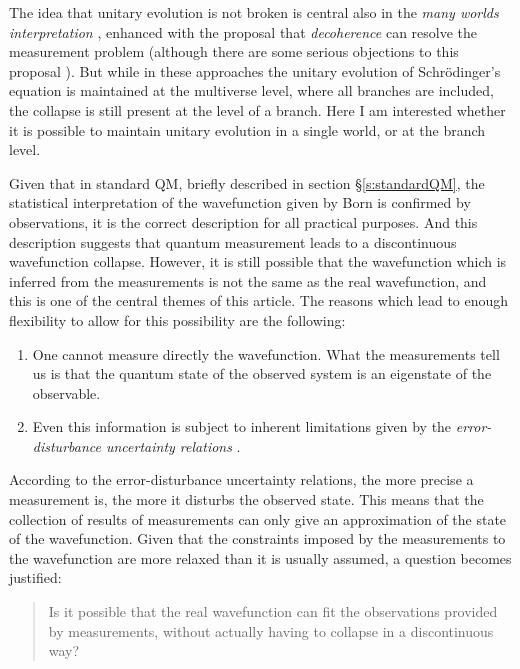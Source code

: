 \documentclass[12pt]{amsart}
\theoremstyle{definition}
\theoremstyle{plain}
\begin{document}
The idea that unitary evolution is not broken is central also in the \emph{many worlds interpretation} \cite{Eve57,Eve73,dWEG73,Vaidman2002MWI}, enhanced with the proposal that \emph{decoherence} can resolve the measurement problem \cite{Zeh96,Zurek2003Decoherence,schlosshauer2005decoherence} (although there are some serious objections to this proposal \cite{pessoa1997canDecoherence,leggett2002limitsQM,kastner2014einselection}). But while in these approaches the unitary evolution of Schr\"odinger's equation is maintained at the multiverse level, where all branches are included, the collapse is still present at the level of a branch. Here I am interested whether it is possible to maintain unitary evolution in a single world, or at the branch level.

Given that in standard QM, briefly described in section \S\ref{s:standardQM}, the statistical interpretation of the wavefunction given by Born is confirmed by observations, it is the correct description for all practical purposes. And this description suggests that quantum measurement leads to a discontinuous wavefunction collapse. However, it is still possible that the wavefunction which is inferred from the measurements is not the same as the real wavefunction, and this is one of the central themes of this article.
The reasons which lead to enough flexibility to allow for this possibility are the following:
\begin{enumerate}
	\item 
One cannot measure directly the wavefunction. What the measurements tell us is that the quantum state of the observed system is an eigenstate of the observable.
	\item 
Even this information is subject to inherent limitations given by the \emph{error-disturbance uncertainty relations} \cite{Heisenberg1927Uncertainty,Ozawa2003Heisenberg,Ozawa2013disprovingHeisenbergErrorDisturbance}. 
\end{enumerate}

According to the error-disturbance uncertainty relations, the more precise a measurement is, the more it disturbs the observed state. This means that the collection of results of measurements can only give an approximation of the state of the wavefunction. Given that the constraints imposed by the measurements to the wavefunction are more relaxed than it is usually assumed, a question becomes justified:

\begin{quote}
Is it possible that the real wavefunction can fit the observations provided by measurements, without actually having to collapse in a discontinuous way?
\end{quote}
\end{document}
